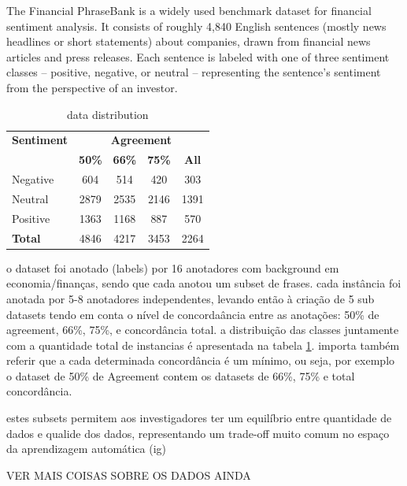 \documentclass[conference]{IEEEtran}
\begin{document}
The Financial PhraseBank is a widely used benchmark dataset for financial sentiment analysis. It consists of roughly 4,840 English sentences (mostly news headlines or short statements) about companies, drawn from financial news articles and press releases. Each sentence is labeled with one of three sentiment classes – positive, negative, or neutral – representing the sentence’s sentiment from the perspective of an investor.

\begin{table}[H]
\centering
\caption{data distribution}
\label{agreement_datasets}
\begin{tabular}{lcccc}
\toprule
\textbf{Sentiment} & \multicolumn{4}{c}{\textbf{Agreement}} \\
\cmidrule(lr){2-5}
 & \textbf{50\%} & \textbf{66\%} & \textbf{75\%} & \textbf{All} \\
\midrule
Negative & 604 & 514 & 420 & 303 \\
Neutral & 2879 & 2535 & 2146 & 1391 \\
Positive & 1363 & 1168 & 887 & 570 \\
\midrule
\textbf{Total} & 4846 & 4217 & 3453 & 2264 \\
\bottomrule
\end{tabular}
\end{table}

o dataset foi anotado (labels) por 16 anotadores com background em economia/finanças, sendo que cada anotou um subset de frases. cada instância foi anotada por 5-8 anotadores independentes, levando então à criação de 5 sub datasets tendo em conta o nível de concordaância entre as anotações: 50\% de agreement, 66\%, 75\%, e concordância total. a distribuição das classes juntamente com a quantidade total de instancias é apresentada na tabela \ref{agreement_datasets}. importa também referir que a cada determinada concordância é um mínimo, ou seja, por exemplo o dataset de 50\% de Agreement contem os datasets de 66\%, 75\% e total concordância.

estes subsets permitem aos investigadores ter um equilíbrio entre quantidade de dados e qualide dos dados, representando um trade-off muito comum no espaço da aprendizagem automática (ig)

VER MAIS COISAS SOBRE OS DADOS AINDA


\end{document}
